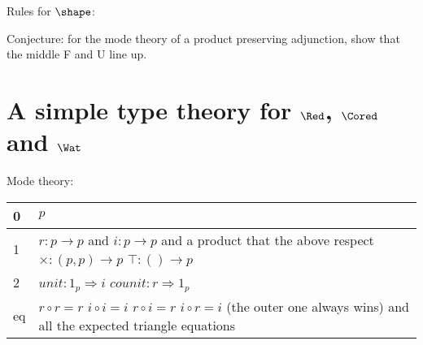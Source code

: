 \documentclass[a4paper,12pt]{article}
\begin{document}
Rules for $\shape$: 

Conjecture: for the mode theory of a product preserving adjunction, show that the middle F and U line up.

\newpage
\section{A simple type theory for $\Red$, $\Cored$ and $\Wat$}
\label{sec:differential}

Mode theory:
\begin{center}
  \begin{tabular}{| l | l |}
    \hline
    0 & $p$ \\
    \hline
    1 & \pbox{20cm}{
      $r : p \to p$ and $i : p \to p$ \\
      and a product that the above respect \\
      $\times : (p, p) \to p$ \hspace{2ex} $\top : () \to p$
    }\\
    \hline
    2 & $unit : 1_p \Rightarrow i$ \hspace{2ex} $counit : r \Rightarrow 1_p$ \\
    \hline
     eq & \pbox{20cm}{\vspace{1ex}
       $r \circ r = r$ \\
       $i \circ i = i$ \\
       $r \circ i = r$ \\
       $i \circ r = i$ \\
       (the outer one always wins) \\
       and all the expected triangle equations
    }\\
    \hline
  \end{tabular}
\end{center}
\end{document}
